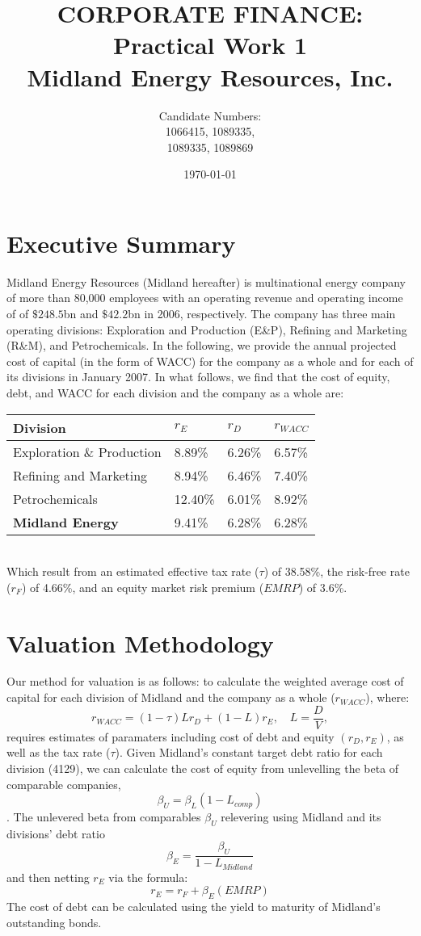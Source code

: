 \documentclass{article}
\title{CORPORATE FINANCE: \\Practical Work 1\\ Midland Energy Resources, Inc.}
\author{Candidate Numbers: \\1066415, 1089335, \\1089335, 1089869}
\date{\today}
\begin{document}
\maketitle

\newpage
\hrulefill
\section{Executive Summary}
Midland Energy Resources (Midland hereafter) is  multinational energy company of more than 80,000 employees with an operating revenue and operating income of of $\$248.5$bn and $\$42.2$bn in 2006, respectively. The company has three main operating divisions: Exploration and Production (E\&P), Refining and Marketing (R\&M), and Petrochemicals. In the following, we provide the annual projected cost of capital (in the form of WACC) for the company as a whole and for each of its divisions in January 2007.
In what follows, we find that the cost of equity, debt, and WACC for each division and the company as a whole are:
\begin{table}[h]
    \centering
    \begin{tabular}{llll}
    \textbf{Division}                  & $r_E$    & $r_D$   & $r_{W\!ACC}$ \\ \hline
    Exploration \& Production & 8.89\%  & 6.26\% & 6.57\%  \\
    Refining and Marketing    & 8.94\%  & 6.46\% & 7.40\%  \\
    Petrochemicals            & 12.40\% & 6.01\% & 8.92\%  \\ \hline
    \textbf{Midland Energy}   & 9.41\%  & 6.28\% & 6.28\% 
    \end{tabular}
\end{table}\\
Which result from an estimated effective tax rate ($\tau$) of 38.58\%, the risk-free rate ($r_F$) of 4.66\%, and an equity market risk premium ($EMRP$) of 3.6\%.

\hrulefill
\section{Valuation Methodology}
Our method for valuation is as follows: to calculate the weighted average cost of capital for each division of Midland and the company as a whole ($r_{W\!ACC}$), where:
\[r_{W\!ACC} = (1 - \tau)Lr_{D} + (1-L)r_E, \quad L=\frac{D}{V},\]
requires estimates of paramaters including cost of debt and equity $(r_{D},r_{E})$, as well as the tax rate ($\tau$). Given Midland's constant target debt ratio for each division (4129), we can calculate the cost of equity from unlevelling the beta of comparable companies, 
$$\beta_U=\beta_L(1-L_{comp})$$
. The unlevered beta from comparables $\beta_U$ relevering using Midland and its divisions' debt ratio
$$\beta_E=\frac{\beta_U}{1-L_{Midland}}$$
and then netting $r_E$ via the formula:
$$r_E=r_F+\beta_E(EMRP)$$
The cost of debt can be calculated using the yield to maturity of Midland's outstanding bonds.
\end{document}
